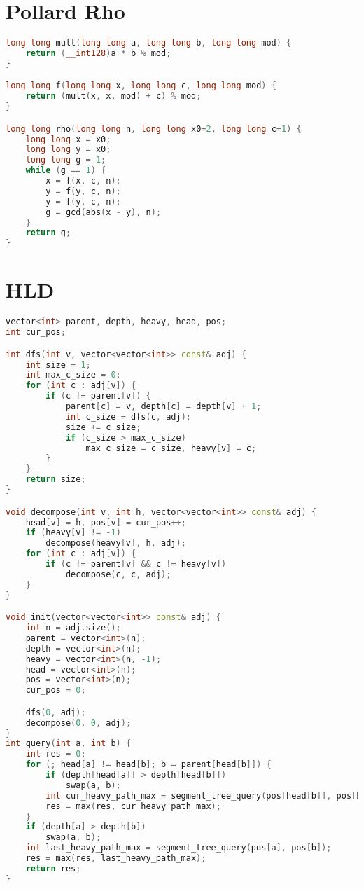 \documentclass[notitlepage]{report}
\begin{document}
\section*{Pollard Rho}
\begin{lstlisting}[language=C++,basicstyle=\footnotesize]
long long mult(long long a, long long b, long long mod) {
    return (__int128)a * b % mod;
}

long long f(long long x, long long c, long long mod) {
    return (mult(x, x, mod) + c) % mod;
}

long long rho(long long n, long long x0=2, long long c=1) {
    long long x = x0;
    long long y = x0;
    long long g = 1;
    while (g == 1) {
        x = f(x, c, n);
        y = f(y, c, n);
        y = f(y, c, n);
        g = gcd(abs(x - y), n);
    }
    return g;
}
\end{lstlisting}
\pagebreak
\section*{HLD}
\begin{lstlisting}[language=C++,basicstyle=\footnotesize]
vector<int> parent, depth, heavy, head, pos;
int cur_pos;

int dfs(int v, vector<vector<int>> const& adj) {
    int size = 1;
    int max_c_size = 0;
    for (int c : adj[v]) {
        if (c != parent[v]) {
            parent[c] = v, depth[c] = depth[v] + 1;
            int c_size = dfs(c, adj);
            size += c_size;
            if (c_size > max_c_size)
                max_c_size = c_size, heavy[v] = c;
        }
    }
    return size;
}

void decompose(int v, int h, vector<vector<int>> const& adj) {
    head[v] = h, pos[v] = cur_pos++;
    if (heavy[v] != -1)
        decompose(heavy[v], h, adj);
    for (int c : adj[v]) {
        if (c != parent[v] && c != heavy[v])
            decompose(c, c, adj);
    }
}

void init(vector<vector<int>> const& adj) {
    int n = adj.size();
    parent = vector<int>(n);
    depth = vector<int>(n);
    heavy = vector<int>(n, -1);
    head = vector<int>(n);
    pos = vector<int>(n);
    cur_pos = 0;

    dfs(0, adj);
    decompose(0, 0, adj);
}
int query(int a, int b) {
    int res = 0;
    for (; head[a] != head[b]; b = parent[head[b]]) {
        if (depth[head[a]] > depth[head[b]])
            swap(a, b);
        int cur_heavy_path_max = segment_tree_query(pos[head[b]], pos[b]);
        res = max(res, cur_heavy_path_max);
    }
    if (depth[a] > depth[b])
        swap(a, b);
    int last_heavy_path_max = segment_tree_query(pos[a], pos[b]);
    res = max(res, last_heavy_path_max);
    return res;
}
\end{lstlisting}
\end{document}
